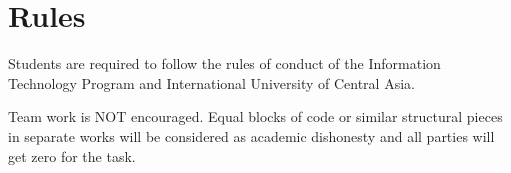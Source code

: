 \documentclass[12pt,a4paper,oneside]{article}
\begin{document}
    \section{Rules}

        Students are required to follow the rules of conduct of the Information Technology Program and International University of Central Asia.

        Team work is NOT encouraged. Equal blocks of code or similar structural
        pieces in separate works will be considered as academic dishonesty and
        all parties will get zero for the task.
\end{document}
